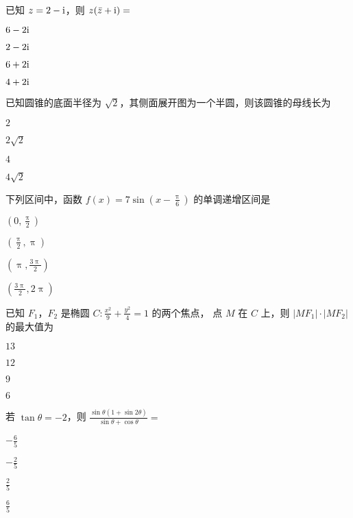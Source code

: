 \documentclass{exam-zh}
\begin{document}
\begin{question}
  已知 $z = 2 - \mathrm{ i }$，则 $z (\bar{z} + \mathrm{ i }) = $ \paren
  \begin{choices}
    \item $6 - 2\mathrm{ i }$
    \item $2 - 2\mathrm{ i }$
    \item $6 + 2\mathrm{ i }$
    \item $4 + 2\mathrm{ i }$
  \end{choices}
\end{question}

\begin{question}
  已知圆锥的底面半径为 $\sqrt{2}$，其侧面展开图为一个半圆，则该圆锥的母线长为 \paren
  \begin{choices}
    \item $2$
    \item $2 \sqrt{2}$
    \item $4$
    \item $4 \sqrt{2}$
  \end{choices}
\end{question}

\begin{question}
  下列区间中，函数 $f(x) = 7 \sin \left( x - \frac{\uppi}{6} \right)$ 的单调递增区间是 \paren
  \begin{choices}
    \item $\left( 0               , \frac{\uppi}{2}  \right)$
    \item $\left( \frac{\uppi}{2} , \uppi            \right)$
    \item $\left( \uppi           , \frac{3\uppi}{2} \right)$
    \item $\left( \frac{3\uppi}{2}, 2\uppi           \right)$
  \end{choices}
\end{question}

\begin{question}
  已知 $F_1$，$F_2$ 是椭圆 $C \colon \frac{x^2}{9} + \frac{y^2}{4} = 1$ 的两个焦点，
  点 $M$ 在 $C$ 上，则 $|M F_1| \cdot |M F_2|$ 的最大值为 \paren
  \begin{choices}
    \item $13$
    \item $12$
    \item $9$
    \item $6$
  \end{choices}
\end{question}

\begin{question}
  若 $\tan\theta = -2$，则 $\frac{\sin\theta (1 + \sin 2\theta)}{\sin\theta + \cos\theta} = $ \paren
  \begin{choices}
    \item $-\frac{6}{5}$
    \item $-\frac{2}{5}$
    \item $\frac{2}{5}$
    \item $\frac{6}{5}$
  \end{choices}
\end{question}
\end{document}
